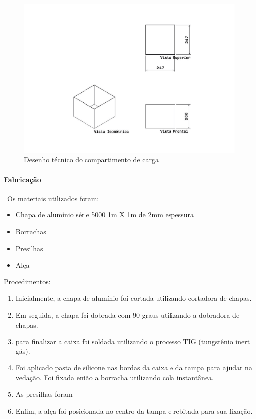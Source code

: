 \begin{figure}[H]
\centering
\includegraphics[width=16cm]{figuras/desenhocompartimento.png}
\caption{Desenho técnico do compartimento de carga}
\end{figure}


\paragraph*{Fabricação}\
Os materiais utilizados foram:

\begin{itemize}
\item Chapa de alumínio série 5000 1m X 1m de 2mm espessura
\item Borrachas
\item Presilhas
\item Alça
\end{itemize}

Procedimentos:
\begin{enumerate}
\item Inicialmente, a chapa de alumínio foi cortada utilizando cortadora de chapas.
\item Em seguida, a chapa foi dobrada com 90 graus utilizando a dobradora de chapas.
\item para finalizar a caixa foi soldada utilizando o processo TIG (tungstênio inert gás). 
\item Foi aplicado pasta de silicone nas bordas da caixa e da tampa para ajudar na vedação. Foi fixada então a borracha utilizando cola instantânea.
\item As presilhas foram
\item Enfim, a alça foi posicionada no centro da tampa e rebitada para sua fixação.
\end{enumerate}

